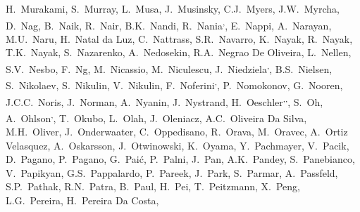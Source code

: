 \begin{flushleft}
H.~Murakami\And, 
S.~Murray\And, 
L.~Musa\And, 
J.~Musinsky\And, 
C.J.~Myers\And, 
J.W.~Myrcha\And, 
D.~Nag\And, 
B.~Naik\And, 
R.~Nair\And, 
B.K.~Nandi\And, 
R.~Nania\textsuperscript{,}\And, 
E.~Nappi\And, 
A.~Narayan\And, 
M.U.~Naru\And, 
H.~Natal da Luz\And, 
C.~Nattrass\And, 
S.R.~Navarro\And, 
K.~Nayak\And, 
R.~Nayak\And, 
T.K.~Nayak\And, 
S.~Nazarenko\And, 
A.~Nedosekin\And, 
R.A.~Negrao De Oliveira\And, 
L.~Nellen\And, 
S.V.~Nesbo\And, 
F.~Ng\And, 
M.~Nicassio\And, 
M.~Niculescu\And, 
J.~Niedziela\textsuperscript{,}\And, 
B.S.~Nielsen\And, 
S.~Nikolaev\And, 
S.~Nikulin\And, 
V.~Nikulin\And, 
F.~Noferini\textsuperscript{,}\And, 
P.~Nomokonov\And, 
G.~Nooren\And, 
J.C.C.~Noris\And, 
J.~Norman\And, 
A.~Nyanin\And, 
J.~Nystrand\And, 
H.~Oeschler\textsuperscript{,}\textsuperscript{,}\And, 
S.~Oh\And, 
A.~Ohlson\textsuperscript{,}\And, 
T.~Okubo\And, 
L.~Olah\And, 
J.~Oleniacz\And, 
A.C.~Oliveira Da Silva\And, 
M.H.~Oliver\And, 
J.~Onderwaater\And, 
C.~Oppedisano\And, 
R.~Orava\And, 
M.~Oravec\And, 
A.~Ortiz Velasquez\And, 
A.~Oskarsson\And, 
J.~Otwinowski\And, 
K.~Oyama\And, 
Y.~Pachmayer\And, 
V.~Pacik\And, 
D.~Pagano\And, 
P.~Pagano\And, 
G.~Pai\'{c}\And, 
P.~Palni\And, 
J.~Pan\And, 
A.K.~Pandey\And, 
S.~Panebianco\And, 
V.~Papikyan\And, 
G.S.~Pappalardo\And, 
P.~Pareek\And, 
J.~Park\And, 
S.~Parmar\And, 
A.~Passfeld\And, 
S.P.~Pathak\And, 
R.N.~Patra\And, 
B.~Paul\And, 
H.~Pei\And, 
T.~Peitzmann\And, 
X.~Peng\And, 
L.G.~Pereira\And, 
H.~Pereira Da Costa\And, 

\end{flushleft}
